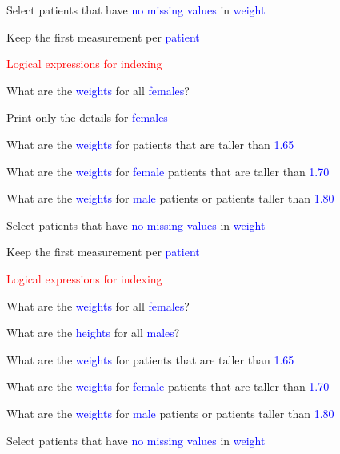 \documentclass{presentatiesmetlogo}
\begin{document}
\item Select patients that have \textcolor{blue}{no missing values} in \textcolor{blue}{weight}
\item Keep the first measurement per \textcolor{blue}{patient}
\eitemt
\eitem
\bitem
\item \textcolor{red}{Logical expressions for indexing}
\bitemt
\item What are the \textcolor{blue}{weights} for all \textcolor{blue}{females}?
\item {}
\item Print only the details for \textcolor{blue}{females}
\item What are the \textcolor{blue}{weights} for patients that are taller than \textcolor{blue}{1.65}
\item What are the \textcolor{blue}{weights} for \textcolor{blue}{female} patients that are taller than \textcolor{blue}{1.70}
\item What are the \textcolor{blue}{weights} for \textcolor{blue}{male} patients or patients taller than \textcolor{blue}{1.80}
\item Select patients that have \textcolor{blue}{no missing values} in \textcolor{blue}{weight}
\item Keep the first measurement per \textcolor{blue}{patient}
\eitemt
\eitem
\bitem
\item \textcolor{red}{Logical expressions for indexing}
\bitemt
\item What are the \textcolor{blue}{weights} for all \textcolor{blue}{females}?
\item What are the \textcolor{blue}{heights} for all \textcolor{blue}{males}?
\item {}
\item What are the \textcolor{blue}{weights} for patients that are taller than \textcolor{blue}{1.65}
\item What are the \textcolor{blue}{weights} for \textcolor{blue}{female} patients that are taller than \textcolor{blue}{1.70}
\item What are the \textcolor{blue}{weights} for \textcolor{blue}{male} patients or patients taller than \textcolor{blue}{1.80}
\item Select patients that have \textcolor{blue}{no missing values} in \textcolor{blue}{weight}
\end{document}
